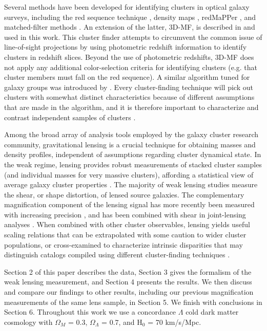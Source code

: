 Several methods have been developed for identifying clusters in optical galaxy surveys, including the red sequence technique \citep{Gladders00}, density maps \citep{Adami10}, redMaPPer \citep{Rykoff14}, and matched-filter methods \citep{Postman96}. An extension of the latter, \ac{3D-MF}, is described in \citet{Milkeraitis10} and used in this work. This cluster finder attempts to circumvent the common issue of line-of-sight projections by using photometric redshift information to identify clusters in redshift slices. Beyond the use of photometric redshifts, \ac{3D-MF} does not apply any additional color-selection criteria for identifying clusters (e.g. that cluster members must fall on the red sequence). A similar algorithm tuned for galaxy groups was introduced by \citet{Gillis11}. Every cluster-finding technique will pick out clusters with somewhat distinct characteristics because of different assumptions that are made in the algorithm, and it is therefore important to characterize and contrast independent samples of clusters \citep{Milkeraitis10}.

Among the broad array of analysis tools employed by the galaxy cluster research community, gravitational lensing is a crucial technique for obtaining masses and density profiles, independent of assumptions regarding cluster dynamical state. In the weak regime, lensing provides robust measurements of stacked cluster samples (and individual masses for very massive clusters), affording a statistical view of average galaxy cluster properties \citep{Hoekstra13}. The majority of weak lensing studies measure the shear, or shape distortion, of lensed source galaxies. The complementary magnification component of the lensing signal has more recently been measured with increasing precision \citep{Scranton05,Hildebrandt09b,Ford12,Ford14,Morrison12,Hildebrandt13,Bauer14}, and has been combined with shear in joint-lensing analyses \citep{Umetsu11,Umetsu14}. When combined with other cluster observables, lensing yields useful scaling relations that can be extrapolated with some caution to wider cluster populations, or cross-examined to characterize intrinsic disparities that may distinguish catalogs compiled using different cluster-finding techniques \citep{Hoekstra07,Johnston07,Leauthaud10,Hoekstra12,Covone14,Oguri14}.

Section 2 of this paper describes the data, Section 3 gives the formalism of the weak lensing measurement, and Section 4 presents the results. We then discuss and compare our findings to other results, including our previous magnification measurements of the same lens sample, in Section 5. We finish with conclusions in Section 6. Throughout this work we use a concordance $\Lambda$ cold dark matter cosmology with $\Omega_M$ = 0.3, $\Omega_{\Lambda}$ = 0.7, and H$_0$ = 70 km/s/Mpc.

